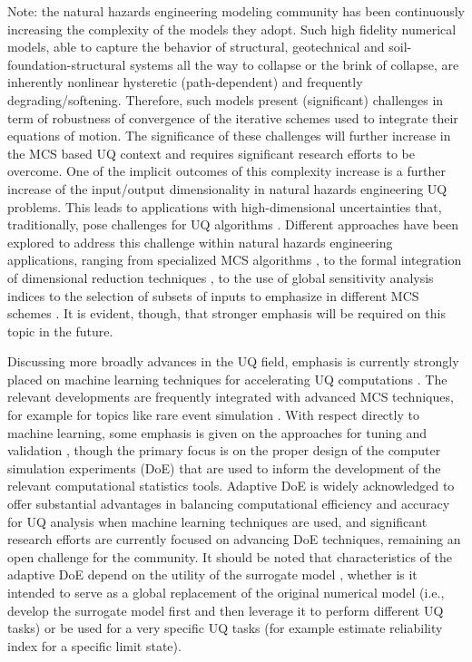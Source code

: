 Note: the natural hazards engineering modeling community has been continuously increasing the complexity of the models they adopt. Such high fidelity numerical models, able to capture the behavior of structural, geotechnical and soil-foundation-structural systems all the way to collapse or the brink of collapse, are inherently nonlinear hysteretic (path-dependent) and frequently degrading/softening. Therefore, such models present (significant) challenges in term of robustness of convergence of the iterative schemes used to integrate their equations of motion. The significance of these challenges will further increase in the MCS based UQ context and requires significant research efforts to be overcome. One of the implicit outcomes of this complexity increase is a further increase of the input/output dimensionality in natural hazards engineering UQ problems. This leads to applications with high-dimensional uncertainties that, traditionally, pose challenges for UQ algorithms \citep{au2003importance,schueller2004critical}. Different approaches have been explored to address this challenge within natural hazards engineering applications, ranging from specialized MCS algorithms \citep{au2001estimation, wang2016crossentropybased}, to the formal integration of dimensional reduction techniques \citep{jia2013kriging}, to the use of global sensitivity analysis indices to the selection of subsets of inputs to emphasize in different MCS schemes \citep{jia2014adaptive}. It is evident, though, that stronger emphasis will be required on this topic in the future.     

Discussing more broadly advances in the UQ field, emphasis is currently strongly placed on machine learning techniques for accelerating UQ computations \citep{murphy2012machine, ghanem2017handbook, tripathy2018deep}. The relevant developments are frequently integrated with advanced MCS techniques, for example for topics like rare event simulation \citep{li2011efficient,balesdent2013krigingbased,bourinet2016rareevent}. With respect directly to machine learning, some emphasis is given on the approaches for tuning and validation \citep{mehmani2018concurrent}, though the primary focus is on the proper design of the computer simulation experiments (DoE) \citep{kleijnen2008design, picheny2010adaptive, kyprioti2020adaptive} that are used to inform the development of the relevant computational statistics tools. Adaptive DoE is widely acknowledged to offer substantial advantages in balancing computational efficiency and accuracy for UQ analysis when machine learning techniques are used, and significant research efforts are currently focused on advancing DoE techniques, remaining an open challenge for the community. It should be noted that characteristics of the adaptive DoE depend on the utility of the surrogate model \citep{liu2018survey}, whether is it intended to serve as a global replacement of the original numerical model (i.e., develop the surrogate model first and then leverage it to perform different UQ tasks) or be used for a very specific UQ tasks (for example estimate reliability index for a specific limit state). 

